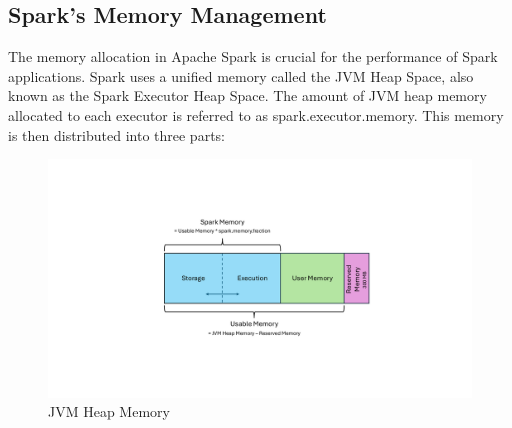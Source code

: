 \subsection{Spark's Memory Management}


The memory allocation in Apache Spark is crucial for the performance of Spark applications. Spark uses a unified memory called the JVM Heap Space, also known as the Spark Executor Heap Space. The amount of JVM heap memory allocated to each executor is referred to as spark.executor.memory. This memory is then distributed into three parts: 

\begin{figure}[ht]
    \centering
    \includegraphics[width=0.7\linewidth]{images/Spark_mem_man.pdf}
    \caption{JVM Heap Memory}
    \label{fig:spark-mem-man}
\end{figure}

